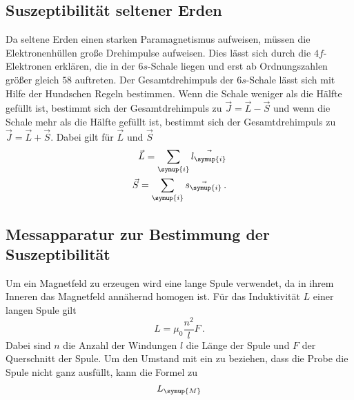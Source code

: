 \subsection{Suszeptibilität seltener Erden}
\label{sec:selteneErden}
Da seltene Erden einen starken Paramagnetismus aufweisen, müssen die Elektronenhüllen große Drehimpulse aufweisen.
Dies lässt sich durch die $4f$-Elektronen erklären, die in der $6s$-Schale liegen und erst ab Ordnungszahlen größer
gleich $58$ auftreten. Der Gesamtdrehimpuls der $6s$-Schale lässt sich mit Hilfe der Hundschen Regeln bestimmen.
Wenn die Schale weniger als die Hälfte gefüllt ist, bestimmt sich der Gesamtdrehimpuls zu $\vec{J}=\vec{L}-\vec{S}$
und wenn die Schale mehr als die Hälfte gefüllt ist, bestimmt sich der Gesamtdrehimpuls zu
$\vec{J}=\vec{L}+\vec{S}$. Dabei gilt für $\vec{L}$ und $\vec{S}$
\begin{align*}
    \vec{L} = \sum_{\symup{i}} \vec{l_{\symup{i}}}\\
    \vec{S} = \sum_{\symup{i}} \vec{s_{\symup{i}}}\,.
\end{align*}

\subsection{Messapparatur zur Bestimmung der Suszeptibilität}
\label{sec:Messapparatur}
Um ein Magnetfeld zu erzeugen wird eine lange Spule verwendet, da in ihrem Inneren das Magnetfeld annähernd homogen
ist. Für das Induktivität $L$ einer langen Spule gilt
\begin{equation*}
    L = \mu_{0}\frac{n^2}{l}F\,.
\end{equation*}
Dabei sind $n$ die Anzahl der Windungen $l$ die Länge der Spule und $F$ der Querschnitt der Spule. Um den Umstand
mit ein zu beziehen, dass die Probe die Spule nicht ganz ausfüllt, kann die Formel zu
\begin{equation}
    L_{\symup{M}}
\end{equation}